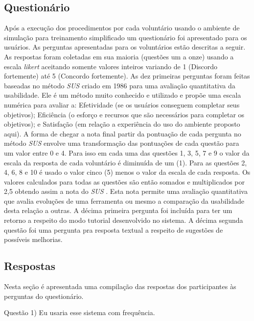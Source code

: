 \subsection{Questionário}
\label{sec:questionarioUsabilidade}

Após a execução dos procedimentos por cada voluntário usando o ambiente de simulação para treinamento simplificado um questionário foi apresentado para os usuários. As perguntas apresentadas para os voluntários estão descritas a seguir. As respostas foram coletadas em sua maioria (questões um a onze) usando a escala \textit{likert} \cite{Norman2010} aceitando somente valores inteiros variando de 1 (Discordo fortemente) até 5 (Concordo fortemente). As dez primeiras perguntas foram feitas baseadas no método \textit{\acrfull{SUS}} \cite{Brooke2013} criado em 1986 para uma avaliação quantitativa da usabilidade. Ele é um método muito conhecido e utilizado e propõe uma escala numérica para avaliar a: Efetividade (se os usuários conseguem completar seus objetivos); 
Eficiência (o esforço e recursos que são necessários para completar os objetivos); e
Satisfação (em relação a experiência do uso do ambiente proposto aqui). A forma de chegar a nota final partir da pontuação de cada pergunta no método \textit{\acrshort{SUS}} \cite{Brooke2013} envolve uma transformação das pontuações de cada questão para  um valor entre 0 e 4. Para isso em cada uma das questões 1, 3, 5, 7 e 9 o valor da escala da resposta de cada voluntário é diminuída de um (1). Para as questões 2, 4, 6, 8 e 10 é usado o valor cinco (5) menos o valor da escala de cada resposta. Os valores calculados para todas as questões são então somados e multiplicados por 2,5 obtendo assim a nota do \textit{\acrshort{SUS}} \cite{Brooke2013}. Esta nota permite uma avaliação quantitativa que avalia evoluções de uma ferramenta ou mesmo a comparação da usabilidade desta relação a outras. 
A décima primeira pergunta foi incluída para ter um retorno a respeito do modo tutorial desenvolvido no sistema. A décima segunda questão foi uma pergunta pra resposta textual a respeito de sugestões de possíveis melhorias.

\subsection{Respostas}
\label{sec:respostasUsabilidade}

Nesta seção é apresentada uma compilação das respostas dos participantes às perguntas do questionário.

Questão 1) Eu usaria esse sistema com frequência.

